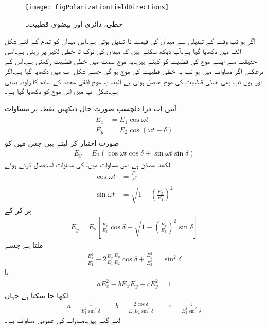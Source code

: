 \begin{figure}
\centering
\texttt{[image: figPolarizationFieldDirections]}
\caption{خطی، دائری اور بیضوی قطبیت۔}
\label{شکل_قطبیت_خطی_قطبیت}
\end{figure}
اگر  ہو تب وقت  کے تبدیلی سے میدان کی قیمت  تا  تبدیل ہوتی ہے۔اس میدان کو تمام  کے لئے شکل -الف میں دکھایا گیا ہے۔آپ دیکھ سکتے ہیں کہ میدان کی نوک  تا  خطی لکیر پر رہتی ہے۔اسی حقیقت سے ایسے موج کی قطبیت کو   کہتے ہیں۔یہ موج  سمت میں خطی قطبیت رکھتی ہے۔اس کے برعکس اگر مساوات  میں  ہو تب یہ  خطی قطبیت کی موج ہو گی جسے شکل -ب میں دکھایا گیا ہے۔اگر  اور  ہوں تب بھی خطی قطبیت کی موج حاصل ہوتی ہے البتہ یہ موج افقی محدد کے ساتھ  کا زاویہ بناتی ہے۔شکل -پ میں اس موج کو دکھایا گیا ہے۔

آئیں اب ذرا دلچسپ صورت حال دیکھیں۔نقطہ  پر مساوات 
\begin{gather}
\begin{aligned}\label{مساوات_قطبیت_ابتدائی_نقطے_پر_میدان}
E_x&=E_1 \cos \omega t\\
E_y&=E_2 \cos (\omega t  -\delta)
\end{aligned}
\end{gather}
صورت اختیار کر لیتے ہیں جس میں  کو
\begin{align*}
E_y=E_2 \left(\cos \omega t \cos \delta + \sin \omega t \sin \delta\right)
\end{align*}
لکھنا ممکن ہے۔اس مساوات میں،   کی مساوات استعمال کرتے ہوئے
\begin{align*}
\cos \omega t &=\tfrac{E_x}{E_1}\\
\sin \omega t&=\sqrt{1-\left(\tfrac{E_x}{E_1} \right)^2}
\end{align*}
پر کر کے
\begin{align*}
E_y=E_2 \left[\frac{E_x}{E_1} \cos \delta+\sqrt{1-\left(\frac{E_x}{E_1}\right)^2} \sin \delta\right]
\end{align*}
ملتا ہے جسے
\begin{align}\label{مساوات_قطبیت_عمومی_بیضوی_قطبیت_الف}
\frac{E_x^2}{E_1^2}-2 \frac{E_x}{E_1} \frac{E_y}{E_2} \cos \delta +\frac{E_y^2}{E_2^2}=\sin^2 \delta
\end{align}
یا
\begin{align}\label{مساوات_قطبیت_عمومی_بیضوی_قطبیت_ب}
a E_x^2-b E_x E_y +c E_y^2=1
\end{align}
لکھا جا سکتا ہے جہاں
\begin{align}
a=\frac{1}{E_1^2 \sin^2 \delta} \quad \quad b=\frac{2 \cos \delta}{E_1 E_2 \sin^2 \delta} \quad \quad c=\frac{1}{E_2^2 \sin^2 \delta}
\end{align}
لئے گئے ہیں۔مساوات   کی عمومی مساوات ہے۔


